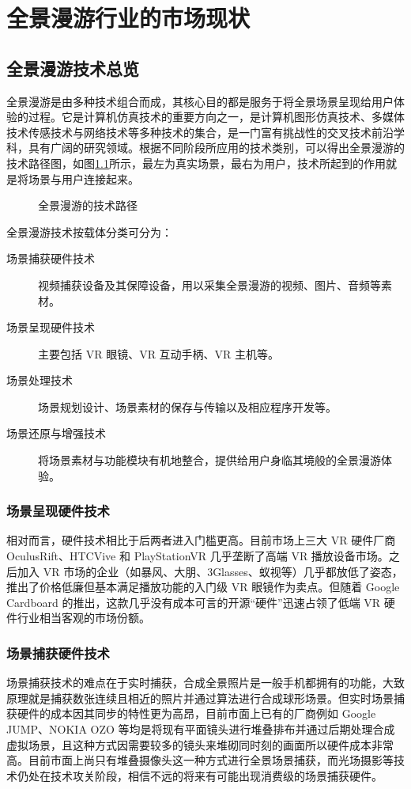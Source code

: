 \chapter{全景漫游行业的市场现状}

\section{全景漫游技术总览}

全景漫游是由多种技术组合而成，其核心目的都是服务于将全景场景呈现给用户体验的过程。它是计算机仿真技术的重要方向之一，是计算机图形仿真技术、多媒体技术传感技术与网络技术等多种技术的集合，是一门富有挑战性的交叉技术前沿学科，具有广阔的研究领域。根据不同阶段所应用的技术类别，可以得出全景漫游的技术路径图，如图\ref{fig:process}所示，最左为真实场景，最右为用户，技术所起到的作用就是将场景与用户连接起来。

\begin{figure}[htp]
\centering
{}
\caption{全景漫游的技术路径}
\label{fig:process}
\end{figure}

全景漫游技术按载体分类可分为：
\begin{description}
\item[场景捕获硬件技术]视频捕获设备及其保障设备，用以采集全景漫游的视频、图片、音频等素材。
\item[场景呈现硬件技术] 主要包括 VR 眼镜、VR 互动手柄、VR 主机等。
\item[场景处理技术] 场景规划设计、场景素材的保存与传输以及相应程序开发等。
\item[场景还原与增强技术] 将场景素材与功能模块有机地整合，提供给用户身临其境般的全景漫游体验。
\end{description}

\subsection{场景呈现硬件技术}
相对而言，硬件技术相比于后两者进入门槛更高。目前市场上三大 VR 硬件厂商 OculusRift、HTCVive 和 PlayStationVR 几乎垄断了高端 VR 播放设备市场。之后加入 VR 市场的企业（如暴风、大朋、3Glasses、蚁视等）几乎都放低了姿态，推出了价格低廉但基本满足播放功能的入门级 VR 眼镜作为卖点。但随着 Google Cardboard 的推出，这款几乎没有成本可言的开源“硬件”迅速占领了低端 VR 硬件行业相当客观的市场份额。

\subsection{场景捕获硬件技术}
场景捕获技术的难点在于实时捕获，合成全景照片是一般手机都拥有的功能，大致原理就是捕获数张连续且相近的照片并通过算法进行合成球形场景。但实时场景捕获硬件的成本因其同步的特性更为高昂，目前市面上已有的厂商例如 Google JUMP、NOKIA OZO 等均是将现有平面镜头进行堆叠排布并通过后期处理合成虚拟场景，且这种方式因需要较多的镜头来堆砌同时刻的画面所以硬件成本非常高。目前市面上尚只有堆叠摄像头这一种方式进行全景场景捕获，而光场摄影等技术仍处在技术攻关阶段，相信不远的将来有可能出现消费级的场景捕获硬件。

